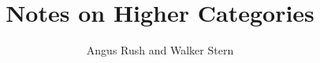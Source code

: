 \documentclass[nohyper,nobib,nofonts]{stern-book}
\title{Notes on Higher Categories}
\author{Angus Rush and Walker Stern}
\begin{document}
	\maketitlepage
	\setcounter{tocdepth}{1}
	\tableofcontents
	
	
	
	
	
	
	
	
	
	\begin{appendices}
	  
	\end{appendices}
	
\end{document}
